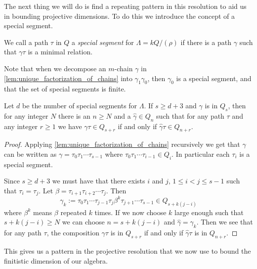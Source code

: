 The next thing we will do is find a repeating pattern in this resolution to aid us in bounding projective dimensions. To do this we introduce the concept of a special segment.

\begin{defn}
	We call a path $\tau$ in $Q$ a \emph{special segment} for $\Lambda = kQ/(\rho)$ if there is a path $\gamma$ such that $\gamma\tau$ is a minimal relation.
\end{defn}

Note that when we decompose an $m$-chain $\gamma$ in \cref{lem:unique_factorization_of_chains} into $\gamma_1\gamma_0$, then $\gamma_0$ is a special segment, and that the set of special segments is finite.

\begin{lemma}\cite[Theorem~2.2]{GKK91}\label{lem:monomial_relation_repetition}
	Let $d$ be the number of special segments for $\Lambda$. If $s \geq d+3$ and $\gamma$ is in $Q_s$, then for any integer $N$ there is an $n \geq N$ and a $\hat{\gamma} \in Q_n$ such that for any path $\tau$ and any integer $r \geq 1$ we have $\gamma\tau \in Q_{s+r}$ if and only if $\hat{\gamma}\tau \in Q_{n+r}$.
	\begin{proof}
		Applying \cref{lem:unique_factorization_of_chains} recursively we get that $\gamma$ can be written as $\gamma = \tau_0\tau_1\cdots \tau_{s-1}$ where $\tau_0\tau_1 \cdots \tau_{i-1} \in Q_i$. In particular each $\tau_i$ is a special segment.
		
		Since $s \geq d+3$ we must have that there exists $i$ and $j$, $1\leq i < j \leq s-1$ such that $\tau_i=\tau_j$. Let $\beta = \tau_{i+1}\tau_{i+2}\cdots\tau_j$. Then $$\gamma_k := \tau_0\tau_1\cdots\tau_{j-1}\tau_j\beta^k\tau_{j+1}\cdots\tau_{s-1} \in Q_{s + k(j-i)}$$
		where $\beta^k$ means $\beta$ repeated $k$ times. If we now choose $k$ large enough such that $s+k(j-i) \geq N$ we can choose $n=s+k(j-i)$ and $\hat{\gamma}=\gamma_k$. Then we see that for any path $\tau$, the composition $\gamma\tau$ is in $Q_{s+r}$ if and only if $\hat{\gamma}\tau$ is in $Q_{n+r}$.
	\end{proof}
\end{lemma}

This gives us a pattern in the projective resolution that we now use to bound the finitistic dimension of our algebra.

